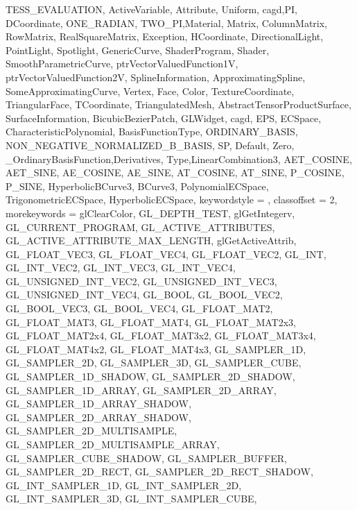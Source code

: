 {{{            TESS_EVALUATION,
            ActiveVariable,
            Attribute, Uniform,
		cagd,PI,
		DCoordinate, ONE_RADIAN, TWO_PI,Material,
		Matrix, ColumnMatrix, RowMatrix, RealSquareMatrix, Exception, HCoordinate, DirectionalLight, PointLight, Spotlight,
		GenericCurve, ShaderProgram, Shader,
		SmoothParametricCurve,
		ptrVectorValuedFunction1V,
		ptrVectorValuedFunction2V,
		SplineInformation,
		ApproximatingSpline,
		SomeApproximatingCurve,
		Vertex, Face, Color, TextureCoordinate, TriangularFace, TCoordinate, TriangulatedMesh, AbstractTensorProductSurface, SurfaceInformation, BicubicBezierPatch, GLWidget,
		cagd,
		EPS, ECSpace, CharacteristicPolynomial, BasisFunctionType, ORDINARY_BASIS, NON_NEGATIVE_NORMALIZED_B_BASIS, SP, Default, Zero, _OrdinaryBasisFunction,Derivatives,	 Type,LinearCombination3, AET_COSINE, AET_SINE, AE_COSINE, AE_SINE, AT_COSINE, AT_SINE, P_COSINE, P_SINE, HyperbolicBCurve3, BCurve3, PolynomialECSpace, TrigonometricECSpace, HyperbolicECSpace}, 
		keywordstyle = {\color[rgb]{0.0, 0.0, 0.70}},
		classoffset = 2,
		morekeywords = {
            glClearColor,
            GL_DEPTH_TEST,
            glGetIntegerv, 
            GL_CURRENT_PROGRAM,
            GL_ACTIVE_ATTRIBUTES,
            GL_ACTIVE_ATTRIBUTE_MAX_LENGTH,
            glGetActiveAttrib,
            GL_FLOAT_VEC3,
            GL_FLOAT_VEC4,
            GL_FLOAT_VEC2,
            GL_INT,
            GL_INT_VEC2,
            GL_INT_VEC3,
            GL_INT_VEC4,
            GL_UNSIGNED_INT_VEC2,
            GL_UNSIGNED_INT_VEC3,
            GL_UNSIGNED_INT_VEC4,
            GL_BOOL,
            GL_BOOL_VEC2,
            GL_BOOL_VEC3,
            GL_BOOL_VEC4,
            GL_FLOAT_MAT2,
            GL_FLOAT_MAT3,
            GL_FLOAT_MAT4,
            GL_FLOAT_MAT2x3,
            GL_FLOAT_MAT2x4,
            GL_FLOAT_MAT3x2,
            GL_FLOAT_MAT3x4,
            GL_FLOAT_MAT4x2,
            GL_FLOAT_MAT4x3,
            GL_SAMPLER_1D,
            GL_SAMPLER_2D,
            GL_SAMPLER_3D,
            GL_SAMPLER_CUBE,
            GL_SAMPLER_1D_SHADOW,
            GL_SAMPLER_2D_SHADOW,
            GL_SAMPLER_1D_ARRAY,
            GL_SAMPLER_2D_ARRAY,
            GL_SAMPLER_1D_ARRAY_SHADOW,
            GL_SAMPLER_2D_ARRAY_SHADOW,
            GL_SAMPLER_2D_MULTISAMPLE,
            GL_SAMPLER_2D_MULTISAMPLE_ARRAY,
            GL_SAMPLER_CUBE_SHADOW,
            GL_SAMPLER_BUFFER,
            GL_SAMPLER_2D_RECT,
            GL_SAMPLER_2D_RECT_SHADOW,
            GL_INT_SAMPLER_1D,
            GL_INT_SAMPLER_2D,
            GL_INT_SAMPLER_3D,
            GL_INT_SAMPLER_CUBE,
}}}
